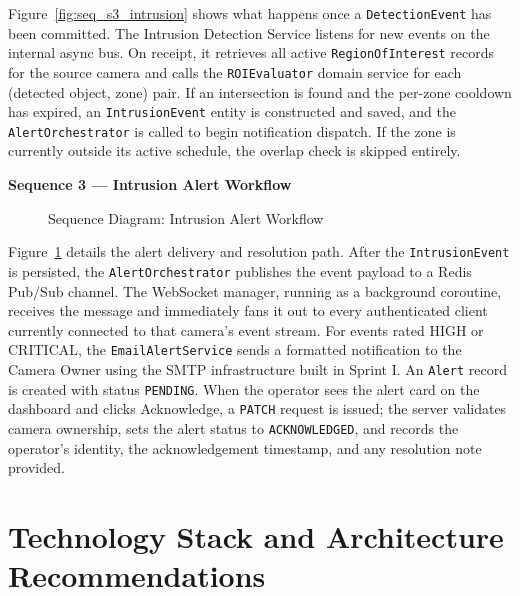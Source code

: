 \hspace{0.8cm}Figure~\ref{fig:seq_s3_intrusion} shows what happens once a \texttt{DetectionEvent} has been committed. The Intrusion Detection Service listens for new events on the internal async bus. On receipt, it retrieves all active \texttt{RegionOfInterest} records for the source camera and calls the \texttt{ROIEvaluator} domain service for each (detected object, zone) pair. If an intersection is found and the per-zone cooldown has expired, an \texttt{IntrusionEvent} entity is constructed and saved, and the \texttt{AlertOrchestrator} is called to begin notification dispatch. If the zone is currently outside its active schedule, the overlap check is skipped entirely.

\textbf{Sequence 3 — Intrusion Alert Workflow}

\begin{figure}[H]
\centering
{}
\caption{Sequence Diagram: Intrusion Alert Workflow}
\label{fig:seq_s3_alert}
\end{figure}

\hspace{0.8cm}Figure~\ref{fig:seq_s3_alert} details the alert delivery and resolution path. After the \texttt{IntrusionEvent} is persisted, the \texttt{AlertOrchestrator} publishes the event payload to a Redis Pub/Sub channel. The WebSocket manager, running as a background coroutine, receives the message and immediately fans it out to every authenticated client currently connected to that camera's event stream. For events rated HIGH or CRITICAL, the \texttt{EmailAlertService} sends a formatted notification to the Camera Owner using the SMTP infrastructure built in Sprint I. An \texttt{Alert} record is created with status \texttt{PENDING}. When the operator sees the alert card on the dashboard and clicks Acknowledge, a \texttt{PATCH} request is issued; the server validates camera ownership, sets the alert status to \texttt{ACKNOWLEDGED}, and records the operator's identity, the acknowledgement timestamp, and any resolution note provided.

\section{Technology Stack and Architecture Recommendations}
\label{sec:s3_tech}

